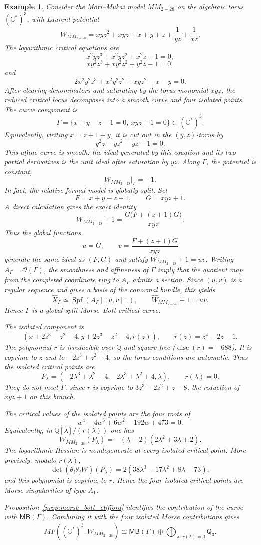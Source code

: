 \documentclass[11pt]{amsart}
\newtheorem{example}{Example}[section]
\newcommand{\MorseCat}[1]{\mathsf{Q}_{#1}}
\newcommand{\MBcat}[1]{\mathsf{MB}(#1)}
\begin{document}
\begin{example}
Consider the Mori--Mukai model $MM_{2-28}$ on the algebraic torus
$(\mathbb{C}^*)^3$, with Laurent potential
\[
W_{MM_{2-28}}=xyz^2+xyz+x+y+z+\frac{1}{yz}+\frac{1}{xz}.
\]
The logarithmic critical equations are
\[
x^2yz^3+x^2yz^2+x^2z-1=0,
\]
\[
xy^2z^3+xy^2z^2+y^2z-1=0,
\]
and
\[
2x^2y^2z^3+x^2y^2z^2+xyz^2-x-y=0.
\]
After clearing denominators and saturating by the torus monomial $xyz$, the
reduced critical locus decomposes into a smooth curve and four isolated
points. The curve component is
\[
\Gamma=\{x+y-z-1=0,\ xyz+1=0\}\subset(\mathbb{C}^*)^3.
\]
Equivalently, writing $x=z+1-y$, it is cut out in the $(y,z)$-torus by
\[
y^2z-yz^2-yz-1=0.
\]
This affine curve is smooth: the ideal generated by this equation and its two
partial derivatives is the unit ideal after saturation by $yz$. Along
$\Gamma$, the potential is constant,
\[
W_{MM_{2-28}}|_{\Gamma}=-1.
\]
In fact, the relative formal model is globally split. Set
\[
F=x+y-z-1,
\qquad
G=xyz+1.
\]
A direct calculation gives the exact identity
\[
W_{MM_{2-28}}+1
=
\frac{G\bigl(F+(z+1)G\bigr)}{xyz}.
\]
Thus the global functions
\[
u=G,
\qquad
v=\frac{F+(z+1)G}{xyz}
\]
generate the same ideal as $(F,G)$ and satisfy $W_{MM_{2-28}}+1=uv$.
Writing $A_{\Gamma}=\mathcal O(\Gamma)$, the smoothness and affineness of
$\Gamma$ imply that the quotient map from the completed coordinate ring to
$A_{\Gamma}$ admits a section. Since $(u,v)$ is a regular sequence and gives
a basis of the conormal bundle, this yields
\[
\widehat X_{\Gamma}
\simeq
\operatorname{Spf}\!\left(A_{\Gamma}[[u,v]]\right),
\qquad
\widehat W_{MM_{2-28}}+1=uv.
\]
Hence $\Gamma$ is a global split Morse--Bott critical curve.

The isolated component is
\[
\left(
x+2z^3-z^2-4,
y+2z^3-z^2-4,
r(z)
\right),
\qquad
r(z)=z^4-2z-1.
\]
The polynomial $r$ is irreducible over $\mathbb{Q}$ and square-free
($\operatorname{disc}(r)=-688$). It is coprime to $z$ and to
$-2z^3+z^2+4$, so the torus conditions are automatic. Thus the isolated
critical points are
\[
P_{\lambda}=\left(
-2\lambda^3+\lambda^2+4,
-2\lambda^3+\lambda^2+4,
\lambda
\right),
\qquad
r(\lambda)=0.
\]
They do not meet $\Gamma$, since $r$ is coprime to
$3z^3-2z^2+z-8$, the reduction of $xyz+1$ on this branch.

The critical values of the isolated points are the four roots of
\[
w^4-4w^3+6w^2-192w+473=0.
\]
Equivalently, in $\mathbb{Q}[\lambda]/(r(\lambda))$ one has
\[
W_{MM_{2-28}}(P_{\lambda})
=-(\lambda-2)(2\lambda^2+3\lambda+2).
\]
The logarithmic Hessian is nondegenerate at every isolated critical point.
More precisely, modulo $r(\lambda)$,
\[
\det(\theta_i\theta_jW)(P_{\lambda})
=2(38\lambda^3-17\lambda^2+8\lambda-73),
\]
and this polynomial is coprime to $r$. Hence the four isolated critical points
are Morse singularities of type $A_1$.

Proposition~\ref{prop:morse_bott_clifford} identifies the contribution of the
curve with $\MBcat{\Gamma}$. Combining it with the four isolated Morse
contributions gives
\[
\overline{MF((\mathbb{C}^*)^3,W_{MM_{2-28}})}
\cong \MBcat{\Gamma}\oplus\bigoplus_{\lambda:\,r(\lambda)=0}\MorseCat{3}.
\]
\end{example}
\end{document}
